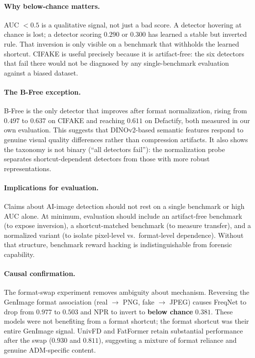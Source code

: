 \documentclass{article}
\begin{document}
\paragraph{Why below-chance matters.}
AUC $< 0.5$ is a qualitative signal, not just a bad score.
A detector hovering at chance is lost; a detector scoring $0.290$ or $0.300$ has learned a stable but inverted rule.
That inversion is only visible on a benchmark that withholds the learned shortcut.
CIFAKE is useful precisely because it is artifact-free: the six detectors that fail there would not be diagnosed by any single-benchmark evaluation against a biased dataset.

\paragraph{The B-Free exception.}
B-Free is the only detector that improves after format normalization, rising from $0.497$ to $0.637$ on CIFAKE and reaching $0.611$ on Defactify, both measured in our own evaluation.
This suggests that DINOv2-based semantic features respond to genuine visual quality differences rather than compression artifacts.
It also shows the taxonomy is not binary (``all detectors fail''): the normalization probe separates shortcut-dependent detectors from those with more robust representations.

\paragraph{Implications for evaluation.}
Claims about AI-image detection should not rest on a single benchmark or high AUC alone.
At minimum, evaluation should include an artifact-free benchmark (to expose inversion), a shortcut-matched benchmark (to measure transfer), and a normalized variant (to isolate pixel-level vs.\ format-level dependence).
Without that structure, benchmark reward hacking is indistinguishable from forensic capability.

\paragraph{Causal confirmation.}
The format-swap experiment removes ambiguity about mechanism.
Reversing the GenImage format association (real $\to$ PNG, fake $\to$ JPEG) causes FreqNet to drop from $0.977$ to $0.503$ and NPR to invert to \textbf{below chance} $0.381$.
These models were not benefiting from a format shortcut; the format shortcut was their entire GenImage signal.
UnivFD and FatFormer retain substantial performance after the swap ($0.930$ and $0.811$), suggesting a mixture of format reliance and genuine ADM-specific content.
\end{document}
